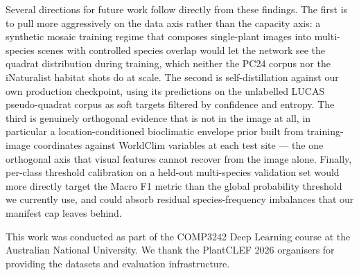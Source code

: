 \documentclass[sigconf]{ceurart}
\begin{document}
Several directions for future work follow directly from these findings. The first is to pull more aggressively on the data axis rather than the capacity axis: a synthetic mosaic training regime that composes single-plant images into multi-species scenes with controlled species overlap would let the network see the quadrat distribution during training, which neither the PC24 corpus nor the iNaturalist habitat shots do at scale. The second is self-distillation against our own production checkpoint, using its predictions on the unlabelled LUCAS pseudo-quadrat corpus as soft targets filtered by confidence and entropy. The third is genuinely orthogonal evidence that is not in the image at all, in particular a location-conditioned bioclimatic envelope prior built from training-image coordinates against WorldClim variables at each test site --- the one orthogonal axis that visual features cannot recover from the image alone. Finally, per-class threshold calibration on a held-out multi-species validation set would more directly target the Macro F1 metric than the global probability threshold we currently use, and could absorb residual species-frequency imbalances that our manifest cap leaves behind.
\begin{acknowledgments}
  This work was conducted as part of the COMP3242 Deep Learning course at the Australian National University. We thank the PlantCLEF 2026 organisers for providing the datasets and evaluation infrastructure.
\end{acknowledgments}

\end{document}
